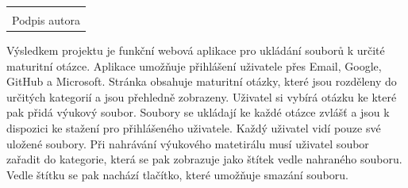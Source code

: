 \documentclass[12pt, a4paper,
oneside,      %
openright
]{report}
\newcommand\datumOdevzdani{1. 1. 2024} %
\begin{document}
\clearpage %
	
	
	\vspace*{0.7\textheight} %

	\vfill
	\noindent{V Opavě \datumOdevzdani\\}
	\noindent
	\begin{minipage}{\linewidth}
		\hspace{9.5cm} 
		\begin{tabular}{@{}p{6cm}@{}}
			\dotfill \\
			Podpis autora
		\end{tabular}
	\end{minipage}
	
	\clearpage %


	Výsledkem projektu je funkční webová aplikace pro ukládání souborů k určité maturitní otázce. Aplikace umožňuje přihlášení uživatele přes Email, Google, GitHub a Microsoft. Stránka obsahuje maturitní otázky, které jsou rozděleny do určitých kategorií a jsou přehledně zobrazeny. Uživatel si vybírá otázku ke které pak přidá výukový soubor. Soubory se ukládají ke každé otázce zvlášť a jsou k dispozici ke stažení pro přihlášeného uživatele. Každý uživatel vidí pouze své uložené soubory. Při nahrávání výukového matetirálu musí uživatel soubor zařadit do kategorie, která se pak zobrazuje jako štítek vedle nahraného souboru. Vedle štítku se pak nachází tlačítko, které umožňuje smazání souboru.
	\\
	
	\vspace{18pt}
	
\end{document}
